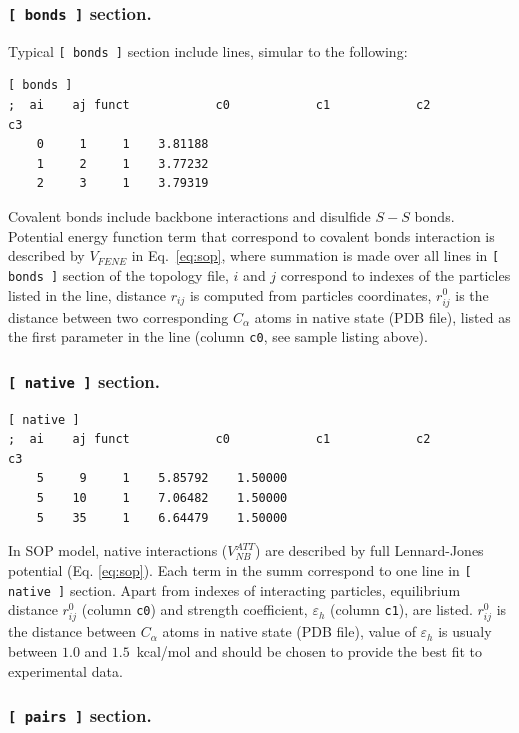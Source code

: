 \documentclass[a4paper]{article}
\begin{document}
\subsubsection{\texttt{[ bonds ]} section.}

Typical \texttt{[ bonds ]} section include lines, simular to the following:
\begin{verbatim}
[ bonds ]
;  ai    aj funct            c0            c1            c2            c3
    0     1     1    3.81188
    1     2     1    3.77232
    2     3     1    3.79319
\end{verbatim}

Covalent bonds include backbone interactions and disulfide $S-S$ bonds. Potential energy function term that correspond to covalent bonds interaction is described by $V_{FENE}$ in Eq.~\ref{eq:sop}, where summation is made over all lines in \texttt{[ bonds ]} section of the topology file, $i$ and $j$ correspond to indexes of the particles listed in the line, distance $r_{ij}$ is computed from particles coordinates, $r^0_{ij}$ is the distance between two corresponding $C_{\alpha}$ atoms in native state (PDB file), listed as the first parameter in the line (column \texttt{c0}, see sample listing above).

\subsubsection{\texttt{[ native ]} section.}


\begin{verbatim}
[ native ]
;  ai    aj funct            c0            c1            c2            c3
    5     9     1    5.85792    1.50000
    5    10     1    7.06482    1.50000
    5    35     1    6.64479    1.50000
\end{verbatim}

In SOP model, native interactions ($V^{ATT}_{NB}$) are described by full Lennard-Jones potential (Eq. \ref{eq:sop}). Each term in the summ correspond to one line in \texttt{[ native ]} section. Apart from indexes of interacting particles, equilibrium distance $r^0_{ij}$ (column \texttt{c0}) and strength coefficient, $\varepsilon_h$ (column \texttt{c1}), are listed. $r^0_{ij}$ is the distance between $C_{\alpha}$ atoms in native state (PDB file), value of $\varepsilon_h$ is usualy between $1.0$ and $1.5$~kcal/mol and should be chosen to provide the best fit to experimental data.

\subsubsection{\texttt{[ pairs ]} section.}
\end{document}
